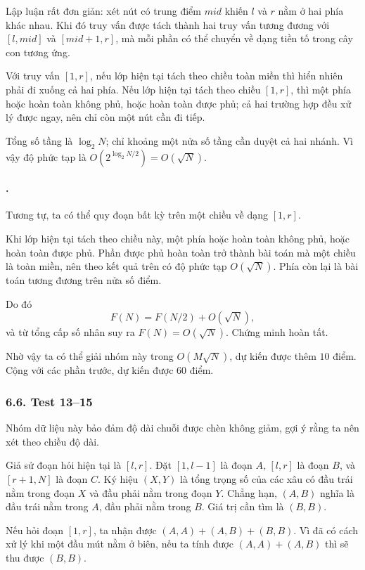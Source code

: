 \documentclass[11pt]{article}
\begin{document}
Lập luận rất đơn giản: xét nút có trung điểm \(mid\) khiến \(l\) và \(r\) nằm
ở hai phía khác nhau. Khi đó truy vấn được tách thành hai truy vấn tương đương
với \([l,mid]\) và \([mid+1,r]\), mà mỗi phần có thể chuyển về dạng tiền tố
trong cây con tương ứng.

Với truy vấn \([1,r]\), nếu lớp hiện tại tách theo chiều toàn miền thì hiển
nhiên phải đi xuống cả hai phía. Nếu lớp hiện tại tách theo chiều \([1,r]\),
thì một phía hoặc hoàn toàn không phủ, hoặc hoàn toàn được phủ; cả hai trường
hợp đều xử lý được ngay, nên chỉ còn một nút cần đi tiếp.

Tổng số tầng là \(\log_2 N\); chỉ khoảng một nửa số tầng cần duyệt cả hai
nhánh. Vì vậy độ phức tạp là \(O(2^{\log_2 N/2})=O(\sqrt N)\).

\paragraph{.}
Tương tự, ta có thể quy đoạn bất kỳ trên một chiều về dạng \([1,r]\).

Khi lớp hiện tại tách theo chiều này, một phía hoặc hoàn toàn không phủ, hoặc
hoàn toàn được phủ. Phần được phủ hoàn toàn trở thành bài toán mà một chiều là
toàn miền, nên theo kết quả trên có độ phức tạp \(O(\sqrt N)\). Phía còn lại
là bài toán tương đương trên nửa số điểm.

Do đó
\[
  F(N)=F(N/2)+O(\sqrt N),
\]
và từ tổng cấp số nhân suy ra \(F(N)=O(\sqrt N)\). Chứng minh hoàn tất.

Nhờ vậy ta có thể giải nhóm này trong \(O(M\sqrt N)\), dự kiến được thêm
\(10\) điểm. Cộng với các phần trước, dự kiến được \(60\) điểm.

\subsubsection*{6.6. Test 13--15}

Nhóm dữ liệu này bảo đảm độ dài chuỗi được chèn không giảm, gợi ý rằng ta nên
xét theo chiều độ dài.

Giả sử đoạn hỏi hiện tại là \([l,r]\). Đặt \([1,l-1]\) là đoạn \(A\),
\([l,r]\) là đoạn \(B\), và \([r+1,N]\) là đoạn \(C\). Ký hiệu \((X,Y)\) là
tổng trọng số của các xâu có đầu trái nằm trong đoạn \(X\) và đầu phải nằm
trong đoạn \(Y\). Chẳng hạn, \((A,B)\) nghĩa là đầu trái nằm trong \(A\), đầu
phải nằm trong \(B\). Giá trị cần tìm là \((B,B)\).

Nếu hỏi đoạn \([1,r]\), ta nhận được \((A,A)+(A,B)+(B,B)\). Vì đã có cách xử
lý khi một đầu mút nằm ở biên, nếu ta tính được \((A,A)+(A,B)\) thì sẽ thu
được \((B,B)\).
\end{document}
